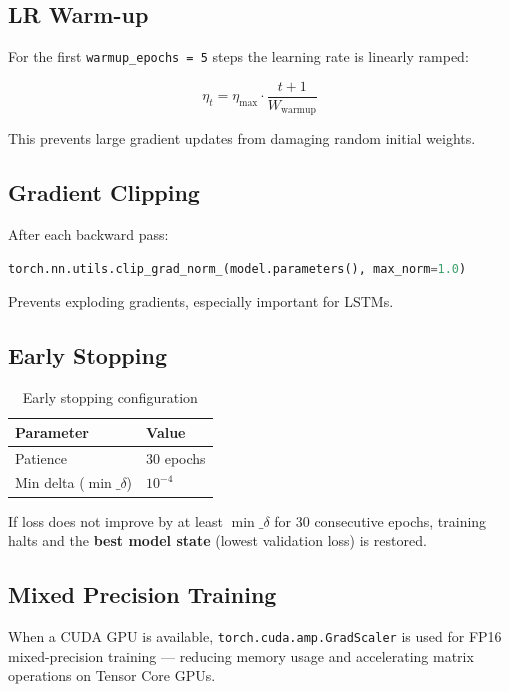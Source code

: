 \documentclass[12pt,a4paper]{article}
\newcommand{\codeinline}[1]{\texttt{\small #1}}
\begin{document}
\subsection{LR Warm-up}
For the first \codeinline{warmup\_epochs = 5} steps the learning rate is linearly ramped:

\begin{equation}
  \eta_t = \eta_{\max} \cdot \frac{t+1}{W_{\text{warmup}}}
\end{equation}

This prevents large gradient updates from damaging random initial weights.

\subsection{Gradient Clipping}
After each backward pass:

\begin{lstlisting}[language=Python]
torch.nn.utils.clip_grad_norm_(model.parameters(), max_norm=1.0)
\end{lstlisting}

Prevents exploding gradients, especially important for LSTMs.

\subsection{Early Stopping}

\begin{table}[H]
\centering
\begin{tabular}{L{4cm} C{4cm}}
\toprule
\textbf{Parameter} & \textbf{Value} \\
\midrule
Patience        & 30 epochs \\
Min delta ($\min\_\delta$) & $10^{-4}$ \\
\bottomrule
\end{tabular}
\caption{Early stopping configuration}
\end{table}

If loss does not improve by at least $\min\_\delta$ for 30 consecutive epochs, training halts and the \textbf{best model state} (lowest validation loss) is restored.

\subsection{Mixed Precision Training}
When a CUDA GPU is available, \codeinline{torch.cuda.amp.GradScaler} is used for FP16 mixed-precision training — reducing memory usage and accelerating matrix operations on Tensor Core GPUs.
\end{document}
